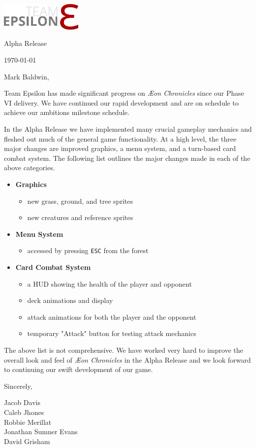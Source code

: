 \documentclass[12pt]{article}
\newcommand\aeon{\textit{\AE on Chronicles}\xspace}
\newcommand\tab[1][.5in]{\hspace*{#1}}
\newcommand\releasename{Alpha Release\xspace}
\newcommand\te{Team Epsilon\xspace}
\begin{document}
\hfill\includegraphics[width=4cm]{../graphics/logo/team-epsilon-light-cropped}

\hfill \releasename

\hfill \today

Mark Baldwin,

\te has made significant progress on \aeon since our Phase VI delivery. We have
continued our rapid development and are on schedule to achieve our ambitions
milestone schedule.

In the \releasename we have implemented many crucial gameplay mechanics and
fleshed out much of the general game functionality. At a high level, the three
major changes are improved graphics, a menu system, and a turn-based card combat
system. The following list outlines the major changes made in each of the above
categories.

\begin{itemize}
    \item \textbf{Graphics}
        \begin{itemize}
            \item new grass, ground, and tree sprites
            \item new creatures and reference sprites
        \end{itemize}

    \item \textbf{Menu System}
        \begin{itemize}
            \item accessed by pressing \texttt{ESC} from the forest
        \end{itemize}

    \item \textbf{Card Combat System}
        \begin{itemize}
            \item a HUD showing the health of the player and opponent
            \item deck animations and display
            \item attack animations for both the player and the opponent
            \item temporary "Attack" button for testing attack mechanics
        \end{itemize}
\end{itemize}

The above list is not comprehensive. We have worked very hard to improve the
overall look and feel of \aeon in the \releasename and we look forward to
continuing our swift development of our game.

Sincerely,

\tab Jacob Davis \\
\tab Caleb Jhones \\
\tab Robbie Merillat \\
\tab Jonathan Sumner Evans \\
\tab David Grisham \\
\end{document}

